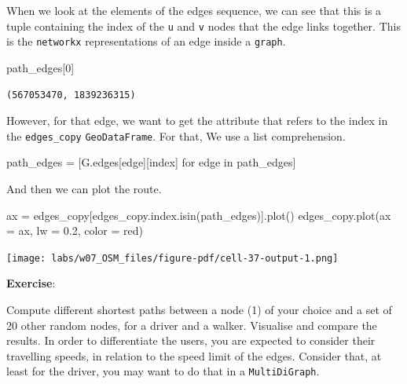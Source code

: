 \documentclass[
  letterpaper,
  DIV=11,
  numbers=noendperiod]{scrreprt}
\newenvironment{Shaded}{\begin{snugshade}}{\end{snugshade}}
\newcommand{\ControlFlowTok}[1]{\textcolor[rgb]{0.00,0.23,0.31}{#1}}
\newcommand{\DecValTok}[1]{\textcolor[rgb]{0.68,0.00,0.00}{#1}}
\newcommand{\FloatTok}[1]{\textcolor[rgb]{0.68,0.00,0.00}{#1}}
\newcommand{\KeywordTok}[1]{\textcolor[rgb]{0.00,0.23,0.31}{#1}}
\newcommand{\NormalTok}[1]{\textcolor[rgb]{0.00,0.23,0.31}{#1}}
\newcommand{\OperatorTok}[1]{\textcolor[rgb]{0.37,0.37,0.37}{#1}}
\newcommand{\StringTok}[1]{\textcolor[rgb]{0.13,0.47,0.30}{#1}}
\begin{document}
When we look at the elements of the edges sequence, we can see that this
is a tuple containing the index of the \texttt{u} and \texttt{v} nodes
that the edge links together. This is the \texttt{networkx}
representations of an edge inside a \texttt{graph}.

\begin{Shaded}
\begin{Highlighting}[]
\NormalTok{path\_edges[}\DecValTok{0}\NormalTok{]}
\end{Highlighting}
\end{Shaded}

\begin{verbatim}
(567053470, 1839236315)
\end{verbatim}

However, for that edge, we want to get the attribute that refers to the
index in the \texttt{edges\_copy} \texttt{GeoDataFrame}. For that, We
use a list comprehension.

\begin{Shaded}
\begin{Highlighting}[]
\NormalTok{path\_edges }\OperatorTok{=}\NormalTok{ [G.edges[edge][}\StringTok{\textquotesingle{}index\textquotesingle{}}\NormalTok{] }\ControlFlowTok{for}\NormalTok{ edge }\KeywordTok{in}\NormalTok{ path\_edges]}
\end{Highlighting}
\end{Shaded}

And then we can plot the route.

\begin{Shaded}
\begin{Highlighting}[]
\NormalTok{ax }\OperatorTok{=}\NormalTok{ edges\_copy[edges\_copy.index.isin(path\_edges)].plot()}
\NormalTok{edges\_copy.plot(ax }\OperatorTok{=}\NormalTok{ ax, lw }\OperatorTok{=} \FloatTok{0.2}\NormalTok{, color }\OperatorTok{=} \StringTok{\textquotesingle{}red\textquotesingle{}}\NormalTok{)}
\end{Highlighting}
\end{Shaded}

\texttt{[image: labs/w07\_OSM\_files/figure-pdf/cell-37-output-1.png]}

\textbf{Exercise}:

Compute different shortest paths between a node (1) of your choice and a
set of 20 other random nodes, for a driver and a walker. Visualise and
compare the results. In order to differentiate the users, you are
expected to consider their travelling speeds, in relation to the speed
limit of the edges. Consider that, at least for the driver, you may want
to do that in a \texttt{MultiDiGraph}.
\end{document}
